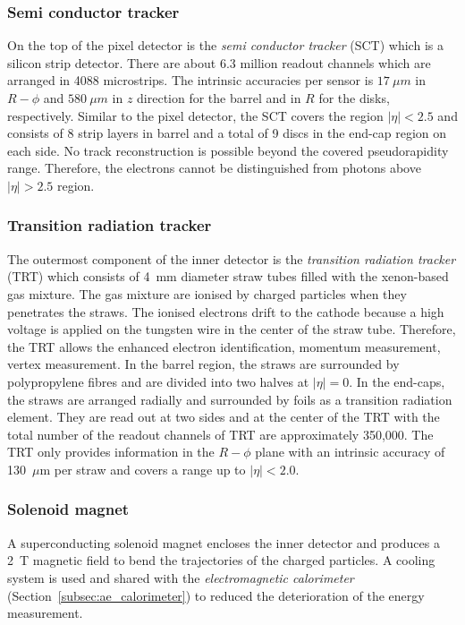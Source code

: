 
\subsubsection{Semi conductor tracker}
\label{subsubsec:ae_sct}
On the top of the pixel detector is the \textit{semi conductor tracker} (SCT) which is a silicon strip detector.
There are about 6.3 million readout channels which are arranged in 4088 microstrips.
The intrinsic accuracies per sensor is $17~\mu m$ in $R-\phi$ and $580~\mu m$ in $z$ direction for the barrel and in $R$ for the  disks, respectively.
Similar to the pixel detector, the SCT covers the region $|\eta| < 2.5$ and consists of 8 strip layers in barrel and a total of 9 discs in the end-cap region on each side.
No track reconstruction is possible beyond the covered pseudorapidity range.
Therefore, the electrons cannot be distinguished from photons above $|\eta| > 2.5$ region.


\subsubsection{Transition radiation tracker}
\label{subsubsec:ae_trt}
The outermost component of the inner detector is the \textit{transition radiation tracker} (TRT) which consists of 4~mm diameter straw tubes filled with the xenon-based gas mixture.
The gas mixture are ionised by charged particles when they penetrates the straws.
The ionised electrons drift to the cathode because a high voltage is applied on the tungsten wire in the center of the straw tube.
Therefore, the TRT allows the enhanced electron identification, momentum measurement, vertex measurement.
In the barrel region, the straws are surrounded by polypropylene fibres and are divided into two halves at $|\eta|=0$.
In the end-caps, the straws are arranged radially and surrounded by foils as a transition radiation element.
They are read out at two sides and at the center of the TRT with the total number of the readout channels of TRT are approximately 350,000.
The TRT only provides information in the $R-\phi$ plane with an intrinsic accuracy of 130~$\mu$m per straw and covers a range up to $|\eta| < 2.0$. 


\subsubsection{Solenoid magnet}
\label{subsubsec:ae_magnetic}
A superconducting solenoid magnet encloses the inner detector and produces a 2~T magnetic field to bend the trajectories of the charged particles.
A cooling system is used and shared with the \textit{electromagnetic calorimeter} (Section~\ref{subsec:ae_calorimeter}) to reduced the deterioration of the energy measurement.

